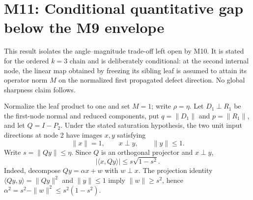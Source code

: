 \section*{M11: Conditional quantitative gap below the M9 envelope}
\label{sec:k3-m11-conditional-gap}

This result isolates the angle--magnitude trade-off left open by M10.  It is
stated for the ordered $k=3$ chain and is deliberately conditional: at the
second internal node, the linear map obtained by freezing its sibling leaf is
assumed to attain its operator norm $M$ on the normalized first propagated
defect direction.  No global sharpness claim follows.

Normalize the leaf product to one and set $M=1$; write
$\rho=\eta$.  Let $D_1\perp R_1$ be the first-node normal and reduced
components, put $q=\|D_1\|$ and $p=\|R_1\|$, and let $Q=I-P_2$.  Under the
stated saturation hypothesis, the two unit input directions at node 2 have
images $x,y$ satisfying
\[
  \|x\|=1,\qquad x\perp y,\qquad \|y\|\le1.
\]
Write $s=\|Qy\|\le\eta$.  Since $Q$ is an orthogonal projector and
$x\perp y$,
\[
  |\langle x,Qy\rangle|\le s\sqrt{1-s^2}.
\]
Indeed, decompose $Qy=\alpha x+w$ with $w\perp x$.  The projection identity
$\langle Qy,y\rangle=\|Qy\|^2$ and $\|y\|\le1$ imply
$\|w\|\ge s^2$, hence $\alpha^2=s^2-\|w\|^2\le s^2(1-s^2)$.

